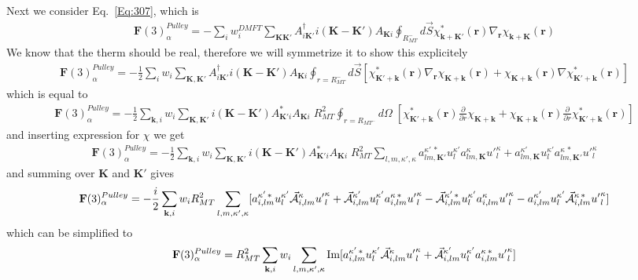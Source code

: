 \documentclass[aps,prb,floatfix,epsfig,singlecolumn,showpacs,preprintnumbers]{revtex4}
\newcommand{\vF}{{\mathbf{F}}}
\renewcommand{\vr}{{\mathbf{r}}}
\newcommand{\vk}{{\mathbf{k}}}
\newcommand{\vK}{{\mathbf{K}}}
\renewcommand{\Im}{\textrm{Im}}
\newcommand{\vcA}{\vec{\cal A}}
\begin{document}
Next we consider Eq.~\ref{Eq:307}, which is 
\begin{eqnarray}
\vF(3)_\alpha^{Pulley}=-\sum_i w^{DMFT}_i\sum_{\vK\vK'} A^{\dagger}_{i\vK'}  i(\vK-\vK')  A_{\vK i} \oint_{R_{MT}^-} d\vec{S}\chi^*_{\vk+\vK'}(\vr)\nabla_\vr \chi_{\vk+\vK}(\vr)
\end{eqnarray}
We know that the therm should be real, therefore we will symmetrize it
to show this explicitely
\begin{eqnarray}
\vF(3)^{Pulley}_\alpha = -\frac{1}{2}\sum_i w_i \sum_{\vK,\vK'}
A_{i\vK'}^\dagger i(\vK-\vK')   A_{\vK i}
\oint_{r=R_{MT}^-} d\vec{S} 
[\chi_{\vK'+\vk}^*(\vr)  \nabla_\vr\chi_{\vK+\vk}(\vr) +  \chi_{\vK+\vk}(\vr) \nabla \chi_{\vK'+\vk}^*(\vr)  ]
\end{eqnarray}
which is equal to
\begin{eqnarray}
\vF(3)_\alpha^{Pulley}=-\frac{1}{2}\sum_{\vk,i} w_i 
\sum_{\vK,\vK'} 
i(\vK-\vK') A^*_{\vK' i} A_{\vK i}\; 
R_{MT}^2
\oint_{r=R_{MT^-}} d\Omega\;  
[
\chi_{\vK'+\vk}^*(\vr) \frac{\partial}{\partial r}\chi_{\vK+\vk}+
\chi_{\vK+\vk}(\vr)  \frac{\partial}{\partial r}\chi_{\vK'+\vk}^*(\vr) 
]
\end{eqnarray}
and inserting expression for $\chi$ we get
\begin{eqnarray}
\vF(3)_\alpha^{Pulley}=-\frac{1}{2}\sum_{\vk,i} w_i 
\sum_{\vK,\vK'} i(\vK-\vK')  
A^*_{\vK' i} A_{\vK i}\; 
R_{MT}^2
\sum_{l,m,\kappa',\kappa}
a_{lm,\vK'}^{\kappa'\,*} u_l^{\kappa'} a_{lm,\vK}^\kappa  {u'}_l^\kappa+
a_{lm,\vK}^{\kappa'} u_l^{\kappa'} a^{\kappa\,*}_{lm,\vK'} {u'}_l^\kappa
\end{eqnarray}
and summing over $\vK$ and $\vK'$ gives
\begin{eqnarray}
\vF(3)_\alpha^{Pulley}=-\frac{i}{2}\sum_{\vk,i} w_i 
R_{MT}^2
\sum_{l,m,\kappa',\kappa}
[
a_{i,lm}^{\kappa'\,*} u_l^{\kappa'} \vcA_{i,lm}^\kappa  {u'}_l^\kappa+
\vcA_{i,lm}^{\kappa'} u_l^{\kappa'} a^{\kappa\,*}_{i,lm}  {u'}_l^\kappa
-\vcA_{i,lm}^{\kappa'\,*} u_l^{\kappa'} a_{i,lm}^\kappa  {u'}_l^\kappa
-a_{i,lm}^{\kappa'} u_l^{\kappa'} \vcA^{\kappa\,*}_{i,lm} {u'}_l^\kappa
]
\end{eqnarray}
which can be simplified to
\begin{eqnarray}
\vF(3)_\alpha^{Pulley}=R_{MT}^2 \sum_{\vk,i} w_i
\sum_{l,m,\kappa',\kappa}
\Im[a_{i,lm}^{\kappa'\,*} u_l^{\kappa'} \vcA_{i,lm}^\kappa  {u'}_l^\kappa
+\vcA_{i,lm}^{\kappa'} u_l^{\kappa'} a^{\kappa\,*}_{i,lm}  {u'}_l^\kappa
]
\label{Eq:358}
\end{eqnarray}
\end{document}
